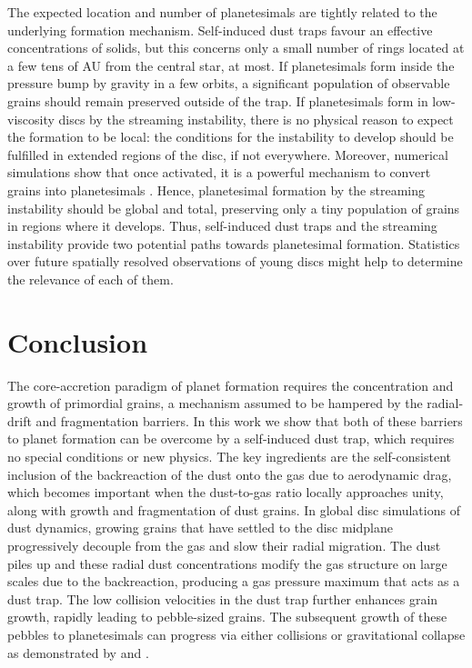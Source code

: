 \documentclass[a4paper,fleqn,usenatbib]{mnras}
\begin{document}
The expected location and number of planetesimals are tightly related to the underlying formation mechanism. Self-induced dust traps favour an effective concentrations of solids, but this concerns only a small number of rings located at a few tens of AU from the central star, at most. If planetesimals form inside the pressure bump by gravity in a few orbits, a significant population of observable grains should remain preserved outside of the trap. If planetesimals form in low-viscosity discs by the streaming instability, there is no physical reason to expect the formation to be local: the conditions for the instability to develop should be fulfilled in extended regions of the disc, if not everywhere. Moreover, numerical simulations show that once activated, it is a powerful mechanism to convert grains into planetesimals \citep{Johansen2007,Bai2010}. Hence, planetesimal formation by the streaming instability should be global and total, preserving only a tiny population of grains in regions where it develops. Thus, self-induced dust traps and the streaming instability provide two potential paths towards planetesimal formation. Statistics over future spatially resolved observations of young discs might help to determine the relevance of each of them.

\section{Conclusion}
\label{sec:Conclusion}

The core-accretion paradigm of planet formation requires the concentration and growth of primordial grains, a mechanism assumed to be hampered by the radial-drift and fragmentation barriers.  In this work we show that both of these barriers to planet formation can be overcome by a self-induced dust trap, which requires no special conditions or new physics.  The key ingredients are the self-consistent inclusion of the backreaction of the dust onto the gas due to aerodynamic drag, which becomes important when the dust-to-gas ratio locally approaches unity, along with growth and fragmentation of dust grains. In global disc simulations of dust dynamics, growing grains that have settled to the disc midplane progressively decouple from the gas and slow their radial migration. The dust piles up and these radial dust concentrations modify the gas structure on large scales due to the backreaction, producing a gas pressure maximum that acts as a dust trap. The low collision velocities in the dust trap further enhances grain growth, rapidly leading to pebble-sized grains. The subsequent growth of these pebbles to planetesimals can progress via either collisions or gravitational collapse as demonstrated by \citet{Johansen2014} and \citet{Levison2015}.
\end{document}
